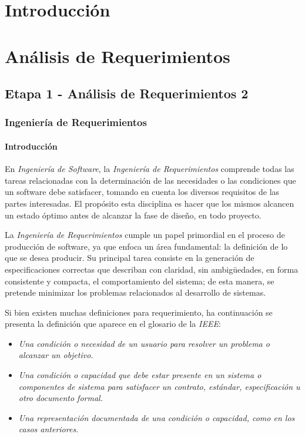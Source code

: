 \documentclass[11pt,oneside]{book}
\begin{document}
\clearpage
\newpage

\chapter{Introducción}

\chapter{Análisis de Requerimientos}
\section{Etapa 1 - Análisis de Requerimientos 2}

\subsection{Ingeniería de Requerimientos}
\subsubsection{Introducción}
En \textit{Ingeniería de Software}, la \textit{Ingeniería de Requerimientos} comprende todas las tareas relacionadas con la determinación de las necesidades o las condiciones que un software debe satisfacer, tomando en cuenta los diversos requisitos de las partes interesadas. El propósito esta disciplina es hacer que los mismos alcancen un estado óptimo antes de alcanzar la fase de diseño, en todo proyecto.

La \textit{Ingeniería de Requerimientos} cumple un papel primordial en el proceso de producción de software, ya que enfoca un área fundamental: la definición de lo que se desea producir. Su principal tarea consiste en la generación de especificaciones correctas que describan con claridad, sin ambigüedades, en forma consistente y compacta, el comportamiento del sistema; de esta manera, se pretende minimizar los problemas relacionados al desarrollo de sistemas.

Si bien existen muchas definiciones para requerimiento, ha continuación se presenta la definición que aparece en el glosario de la \textit{IEEE}:

\begin{itemize}
\item \textit{Una condición o necesidad de un usuario para resolver un problema o alcanzar un objetivo.}
\item \textit{Una condición o capacidad que debe estar presente en un sistema o componentes de sistema para satisfacer un contrato, estándar, especificación u otro documento formal.}
\item \textit{Una representación documentada de una condición o capacidad, como en los casos anteriores.}
\end{itemize}
\end{document}

